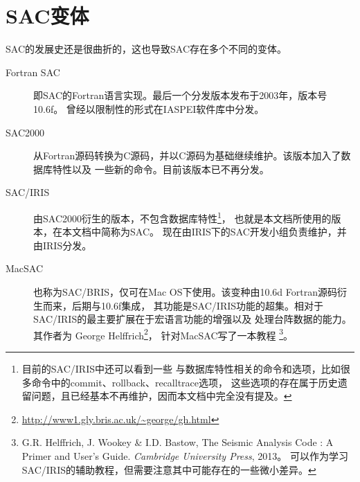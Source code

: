 \section{SAC变体}

SAC的发展史还是很曲折的，这也导致SAC存在多个不同的变体。

\begin{description}
\item[Fortran SAC]  即SAC的Fortran语言实现。最后一个分发版本发布于2003年，版本号10.6f。
                    曾经以限制性的形式在IASPEI软件库中分发。
\item[SAC2000]      从Fortran源码转换为C源码，并以C源码为基础继续维护。该版本加入了数据库特性以及
                    一些新的命令。目前该版本已不再分发。
\item[SAC/IRIS]     由SAC2000衍生的版本，不包含数据库特性\footnote{目前的SAC/IRIS中还可以看到一些
                    与数据库特性相关的命令和选项，比如很多命令中的commit、rollback、recalltrace选项，
                    这些选项的存在属于历史遗留问题，且已经基本不再维护，因而本文档中完全没有提及。}，
                    也就是本文档所使用的版本，在本文档中简称为SAC。
                    现在由IRIS下的SAC开发小组负责维护，并由IRIS分发。
\item[MacSAC]       也称为SAC/BRIS，仅可在Mac OS下使用。该变种由10.6d Fortran源码衍生而来，后期与10.6f集成，
                    其功能是SAC/IRIS功能的超集。相对于SAC/IRIS的最主要扩展在于宏语言功能的增强以及
                    处理台阵数据的能力。其作者为
                    George Helffrich\footnote{\url{http://www1.gly.bris.ac.uk/~george/gh.html}}，
                    针对MacSAC写了一本教程
                    \footnote{G.R. Helffrich, J. Wookey \& I.D. Bastow, The Seismic Analysis Code
                    : A Primer and User's Guide. \textsl{Cambridge University Press}, 2013。
                    可以作为学习SAC/IRIS的辅助教程，但需要注意其中可能存在的一些微小差异。}。
\end{description}
